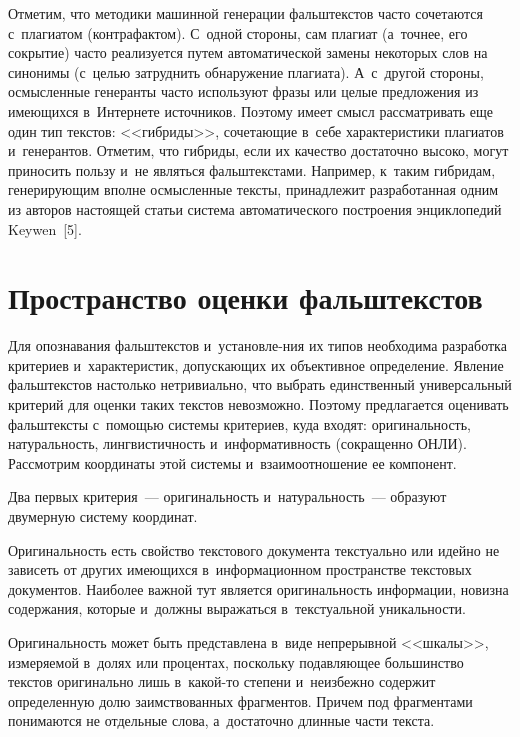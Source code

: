 \begin{multicols}{2}
   Отметим, что методики машинной генерации фальштекстов часто
сочетаются с~плагиатом (контрафактом). С~одной стороны, сам плагиат
(а~точнее, его сокрытие) часто реализуется путем автомати\-че\-ской замены
некоторых слов на синонимы (с~\mbox{целью} затруднить обнаружение плагиата).
А~с~другой стороны, осмысленные генеранты часто используют фразы или
целые предложения из имеющихся в~Интернете источников. Поэтому имеет
смысл рассматривать еще один тип текстов: <<гибриды>>, сочетающие
в~себе характеристики плагиатов и~генерантов. Отметим, что гибриды, если
их качество достаточно высоко, могут приносить пользу и~не являться
фальштекстами. Например, к~таким гиб\-ри\-дам, генерирующим вполне
осмысленные тексты, принадлежит разработанная одним из авторов
настоящей статьи система автоматического построения энциклопедий
Keywen~[5].

\section{Пространство оценки фальштекстов}

   Для опознавания фальштекстов и~установле-\linebreak ния их типов необходима
разработка критериев и~характеристик, допускающих их объективное\linebreak
определение. Явление фальштекстов настолько нетривиально,
что выбрать единственный универсальный критерий для оценки таких
текстов невозможно. Поэтому предлагается оценивать фальштексты
   с~по\-мощью системы критериев, куда \mbox{входят}: оригинальность,
натуральность, лингвистичность и~информативность (сокращенно \mbox{ОНЛИ}).
Рассмотрим координаты этой системы и~взаимоотношение ее компонент.

   Два первых критерия~--- оригинальность и~натуральность~--- образуют
двумерную систему координат.

   Оригинальность есть свойство текстового документа текстуально или
идейно не зависеть от других имеющихся в~информационном пространстве
текс\-то\-вых документов. Наиболее важной тут является оригинальность
информации, новизна содержания, которые и~должны выражаться
в~текстуальной уникальности.

   Оригинальность может быть представлена в~виде непрерывной
<<шкалы>>, измеряемой в~долях или процентах, поскольку подавляющее
большинство текстов оригинально лишь в~ка\-кой-то степени и~неизбежно
содержит определенную долю заимствованных фрагментов. Причем под
фрагментами понимаются не отдельные слова, а~достаточно длинные части
текста.


\end{multicols}
